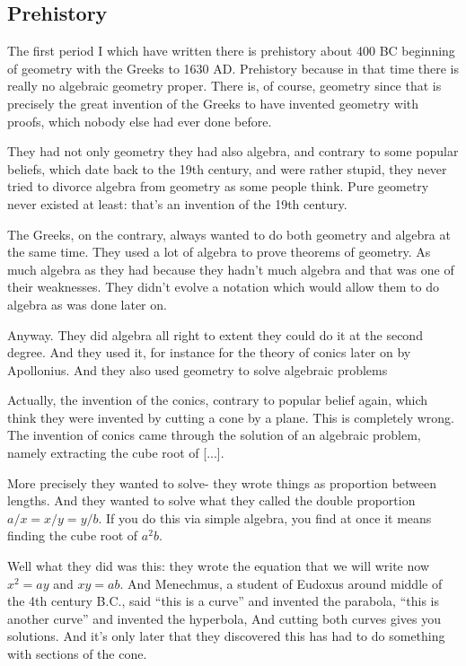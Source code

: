 \documentclass{article}
\begin{document}
\subsection{Prehistory}

The first period I which have written there is prehistory 
about 400 BC beginning of geometry 
with the Greeks to 1630 AD. 
Prehistory because in that time 
there is really no algebraic geometry proper.
There is, of course, geometry 
since that is precisely the great invention of the Greeks 
to have invented geometry with proofs, 
which nobody else had ever done before.

They had not only geometry they had also algebra, 
and contrary to some popular beliefs, 
which date back to the 19th century, 
and were rather stupid,
they never tried to divorce algebra from geometry 
as some people think. 
Pure geometry never existed at least: that's an invention of the 19th century.

The Greeks, on the contrary, 
always wanted to do both geometry and algebra at the same time.
They used a lot of algebra to prove theorems of geometry.
As much algebra as they had 
because they hadn't much algebra 
and that was one of their weaknesses.
They didn't evolve a notation 
which would allow them to do algebra 
as was done later on.

Anyway.
They did algebra all right 
to extent they could do it 
at the second degree.
And they used it, 
for instance for the theory of conics 
later on by Apollonius.
And they also used geometry 
to solve algebraic problems

Actually, the invention of the conics, 
contrary to popular belief again, 
which think they were invented 
by cutting a cone by a plane.
This is completely wrong.
The invention of conics came 
through the solution of an algebraic problem, 
namely extracting the cube root of [...].

More precisely they wanted to solve- 
they wrote things as proportion between lengths.
And they wanted to solve 
what they called the double proportion
$a/x=x/y=y/b$.
If you do this via simple algebra, 
you find at once it means finding 
the cube root of $a^2b$.

Well what they did was this: they wrote the equation that we will write now $x^2=ay$ and $xy=ab$.
And Menechmus, a student of Eudoxus 
around middle of the 4th century B.C.,
said ``this is a curve'' and invented the parabola, 
``this is another curve'' and invented the hyperbola,
And cutting both curves gives you solutions. 
And it's only later that they discovered 
this has had to do something with sections of the cone.
\end{document}

